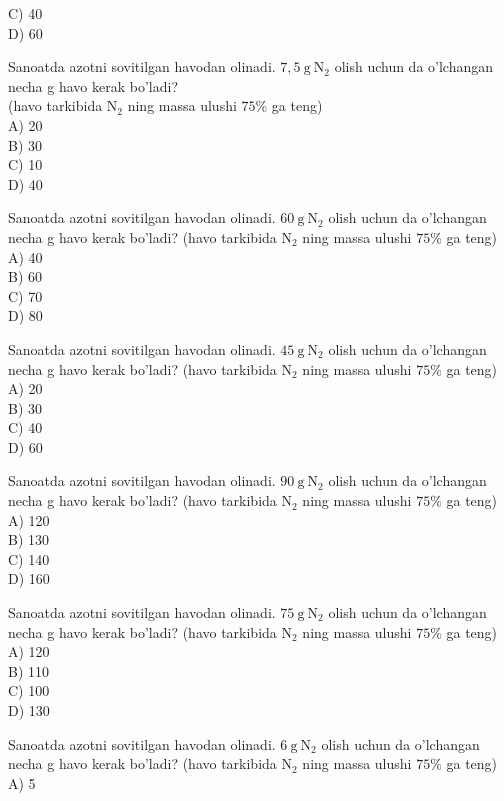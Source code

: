 C) 40\\
D) 60
  \item Sanoatda azotni sovitilgan havodan olinadi. $7,5 \mathrm{~g} \mathrm{~N}_{2}$ olish uchun da o'lchangan necha g havo kerak bo'ladi?\\
(havo tarkibida $\mathrm{N}_{2}$ ning massa ulushi $75 \%$ ga teng)\\
A) 20\\
B) 30\\
C) 10\\
D) 40
  \item Sanoatda azotni sovitilgan havodan olinadi. $60 \mathrm{~g} \mathrm{~N}_{2}$ olish uchun da o'lchangan necha g havo kerak bo'ladi? (havo tarkibida $\mathrm{N}_{2}$ ning massa ulushi $75 \%$ ga teng)\\
A) 40\\
B) 60\\
C) 70\\
D) 80
  \item Sanoatda azotni sovitilgan havodan olinadi. $45 \mathrm{~g} \mathrm{~N}_{2}$ olish uchun da o'lchangan necha g havo kerak bo'ladi? (havo tarkibida $\mathrm{N}_{2}$ ning massa ulushi $75 \%$ ga teng)\\
A) 20\\
B) 30\\
C) 40\\
D) 60
  \item Sanoatda azotni sovitilgan havodan olinadi. $90 \mathrm{~g} \mathrm{~N}_{2}$ olish uchun da o'lchangan necha g havo kerak bo'ladi? (havo tarkibida $\mathrm{N}_{2}$ ning massa ulushi $75 \%$ ga teng)\\
A) 120\\
B) 130\\
C) 140\\
D) 160
  \item Sanoatda azotni sovitilgan havodan olinadi. $75 \mathrm{~g} \mathrm{~N}_{2}$ olish uchun da o'lchangan necha g havo kerak bo'ladi? (havo tarkibida $\mathrm{N}_{2}$ ning massa ulushi $75 \%$ ga teng)\\
A) 120\\
B) 110\\
C) 100\\
D) 130
  \item Sanoatda azotni sovitilgan havodan olinadi. $6 \mathrm{~g} \mathrm{~N}_{2}$ olish uchun da o'lchangan necha g havo kerak bo'ladi? (havo tarkibida $\mathrm{N}_{2}$ ning massa ulushi $75 \%$ ga teng)\\
A) 5\\
